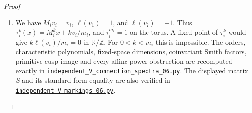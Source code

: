 \begin{proof}
\begin{enumerate}[label={$\langle1\rangle$\arabic*.}]
\item We have $M_iv_i=v_i$, $\ell(v_1)=1$, and $\ell(v_2)=-1$.
Thus $\tau_i^k(x)=M_i^kx+kv_i/m_i$, and $\tau_i^{m_i}=1$ on the
torus.  A fixed point of $\tau_i^k$ would give
$k\ell(v_i)/m_i=0$ in $\mathbb R/\mathbb Z$.  For
$0<k<m_i$ this is impossible.  The orders, characteristic polynomials, fixed-space dimensions,
coinvariant Smith factors, primitive cusp image and every affine-power
obstruction are recomputed exactly in
\href{https://github.com/KokunoYumeto/s6-complex-structure-workbench/blob/83d76022bcd442278b760db9ff438afceed6c6ea/pro_returns/S6_SERIES_GRIND_checkpoint_10_20261120T0211Z/code/current_audits/audit_corrections/code/independent_V_connection_spectra_06.py}{\texttt{independent\_V\_connection\_spectra\_06.py}}.
 The displayed matrix $S$ and its
standard-form equality are also verified in
\href{https://github.com/KokunoYumeto/s6-complex-structure-workbench/blob/83d76022bcd442278b760db9ff438afceed6c6ea/pro_returns/S6_SERIES_GRIND_checkpoint_10_20261120T0211Z/code/current_audits/audit_corrections/code/independent_V_markings_06.py}{\texttt{independent\_V\_markings\_06.py}}.

\end{enumerate}
\end{proof}

